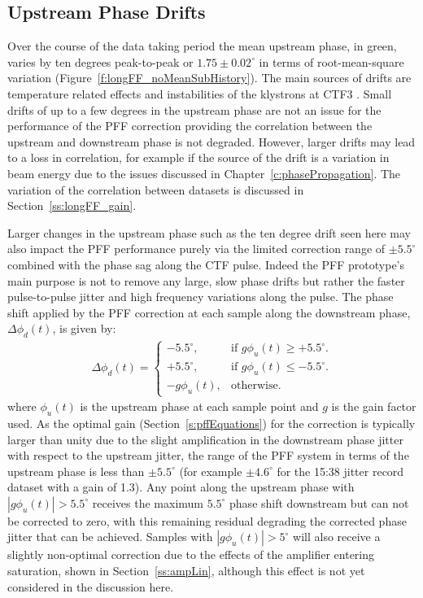 \subsection{Upstream Phase Drifts}
\label{ss:longFF_upDrifts}

Over the course of the data taking period the mean upstream phase, in green, varies by ten degrees peak-to-peak or \(1.75 \pm 0.02^\circ\) in terms of root-mean-square variation (Figure~\ref{f:longFF_noMeanSubHistory}). The main sources of drifts are temperature related effects and instabilities of the klystrons at CTF3 \cite{lukasIPAC16}. Small drifts of up to a few degrees in the upstream phase are not an issue for the performance of the PFF correction providing the correlation between the upstream and downstream phase is not degraded. However, larger drifts may lead to a loss in correlation, for example if the source of the drift is a variation in beam energy due to the issues discussed in Chapter~\ref{c:phasePropagation}. The variation of the correlation between datasets is discussed in Section~\ref{ss:longFF_gain}.

Larger changes in the upstream phase such as the ten degree drift seen here may also impact the PFF performance purely via the limited correction range of \(\pm5.5^\circ\) combined with the phase sag along the CTF pulse. Indeed the PFF prototype's main purpose is not to remove any large, slow phase drifts but rather the faster pulse-to-pulse jitter and high frequency variations along the pulse. The phase shift applied by the PFF correction at each sample along the downstream phase, \(\Delta\phi_d(t)\), is given by:
\begin{eqnarray}
	\Delta\phi_d(t) = \begin{cases}
	-5.5^\circ, &  \text{if $g\phi_u(t) \geq+5.5^\circ$.}\\
	+5.5^\circ, &  \text{if $g\phi_u(t)\leq-5.5^\circ$}.\\
	-g\phi_u(t), &  \text{otherwise.}
	\end{cases}
	\label{e:limCorrection}
\end{eqnarray}
where \(\phi_u(t)\) is the upstream phase at each sample point and \(g\) is the gain factor used. As the optimal gain (Section~\ref{s:pffEquations}) for the correction is typically larger than unity due to the slight amplification in the downstream phase jitter with respect to the upstream jitter, the range of the PFF system in terms of the upstream phase is less than \(\pm5.5^\circ\) (for example \(\pm4.6^\circ\) for the 15:38 jitter record dataset with a gain of 1.3). Any point along the upstream phase with \(|g\phi_u(t)| > 5.5^\circ\) receives the maximum \(5.5^\circ\) phase shift downstream but can not be corrected to zero, with this remaining residual degrading the corrected phase jitter that can be achieved. Samples with  \(|g\phi_u(t)| > 5^\circ\) will also receive a slightly non-optimal correction due to the effects of the amplifier entering saturation, shown in Section~\ref{ss:ampLin}, although this effect is not yet considered in the discussion here.

